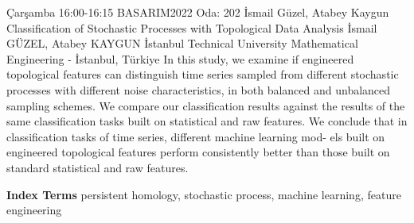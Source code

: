 
    \begin{abstract_basarim}
    {Çarşamba 16:00-16:15}
    {BASARIM2022}
    {Oda: 202}
    {İsmail Güzel, Atabey Kaygun}
    {Classification of Stochastic Processes with Topological Data Analysis}
    {%
    İsmail GÜZEL, Atabey KAYGUN}
    {%
    }
    {%
    İstanbul Technical University Mathematical Engineering - İstanbul, Türkiye}
    In this study, we examine if engineered topological features can distinguish time series sampled from different stochastic processes with different noise characteristics, in both balanced and unbalanced sampling schemes. We compare our classification results against the results of the same classification tasks built on statistical and raw features. We conclude that in classification tasks of time series, different machine learning mod- els built on engineered topological features perform consistently better than those built on standard statistical and raw features. 
    
            \textbf{Index Terms} \newline{}persistent homology, stochastic process, machine learning, feature engineering
    \end{abstract_basarim}
    